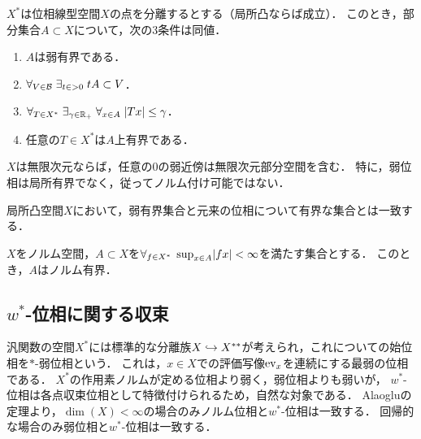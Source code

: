 \documentclass[uplatex,dvipdfmx]{jsreport}
\begin{document}
\begin{proposition}
    $X^*$は位相線型空間$X$の点を分離するとする（局所凸ならば成立）．
    このとき，部分集合$A\subset X$について，次の3条件は同値．
    \begin{enumerate}
        \item $A$は弱有界である．
        \item $\forall_{V\in\mathcal{B}}\;\exists_{t\in>0}\;tA\subset V$．
        \item $\forall_{T\in X^*}\;\exists_{\gamma\in\mathbb{R}_+}\;\forall_{x\in A}\;\lvert Tx\rvert\le\gamma$．
        \item 任意の$T\in X^*$は$A$上有界である．
    \end{enumerate}
\end{proposition}

\begin{corollary}
    $X$は無限次元ならば，任意の$0$の弱近傍は無限次元部分空間を含む．
    特に，弱位相は局所有界でなく，従ってノルム付け可能ではない．
\end{corollary}

\begin{proposition}
    局所凸空間$X$において，弱有界集合と元来の位相について有界な集合とは一致する．
\end{proposition}

\begin{corollary}
    $X$をノルム空間，$A\subset X$を$\forall_{f\in X^*}\;\sup_{x\in A}\lvert fx\rvert<\infty$を満たす集合とする．
    このとき，$A$はノルム有界．
\end{corollary}

\subsection{$w^*$-位相に関する収束}

\begin{tcolorbox}[colframe=ForestGreen, colback=ForestGreen!10!white,breakable,colbacktitle=ForestGreen!40!white,coltitle=black,fonttitle=\bfseries\sffamily,
title=]
    汎関数の空間$X^*$には標準的な分離族$X\hookrightarrow X^{**}$が考えられ，これについての始位相を$*$-弱位相という．
    これは，$x\in X$での評価写像$\mathrm{ev}_x$を連続にする最弱の位相である．
    $X^*$の作用素ノルムが定める位相より弱く，弱位相よりも弱いが，
    $w^*$-位相は各点収束位相として特徴付けられるため，自然な対象である．
    Alaogluの定理より，$\dim(X)<\infty$の場合のみノルム位相と$w^*$-位相は一致する．
    回帰的な場合のみ弱位相と$w^*$-位相は一致する．
\end{tcolorbox}
\end{document}

